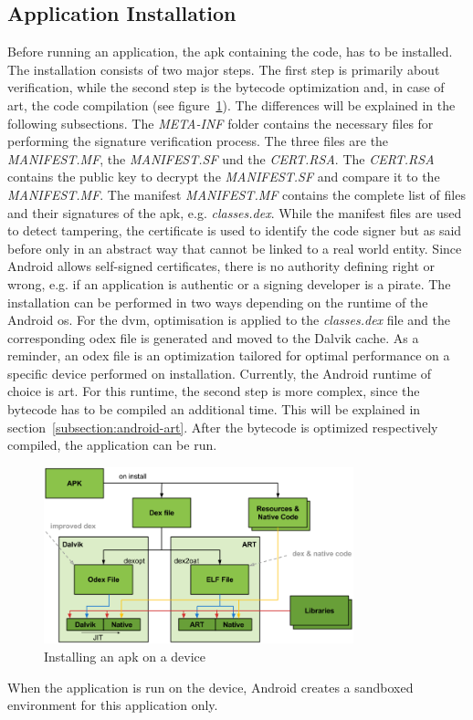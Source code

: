 \subsection{Application Installation} \label{subsection:android-install}
Before running an application, the \gls{apk} containing the code, has to be installed.
The installation consists of two major steps.
The first step is primarily about verification, while the second step is the bytecode optimization and, in case of \gls{art}, the code compilation (see figure~\ref{fig:install}).
The differences will be explained in the following subsections.
\newline
The \textit{META-INF} folder contains the necessary files for performing the signature verification process.
The three files are the \textit{MANIFEST.MF}, the \textit{MANIFEST.SF} und the \textit{CERT.RSA}.
The \textit{CERT.RSA} contains the public key to decrypt the \textit{MANIFEST.SF} and compare it to the \textit{MANIFEST.MF}.
The manifest \textit{MANIFEST.MF} contains the complete list of files and their signatures of the \gls{apk}, e.g. \textit{classes.dex}.
While the manifest files are used to detect tampering, the certificate is used to identify the code signer but as said before only in an abstract way that cannot be linked to a real world entity.
Since Android allows self-signed certificates, there is no authority defining right or wrong, e.g. if an application is authentic or a signing developer is a pirate. \cite{codeSigning} \cite{androidSigning} \cite{nelenkovSelf}
\newline
The installation can be performed in two ways depending on the runtime of the Android \gls{os}.
For the \gls{dvm}, optimisation is applied to the \textit{classes.dex} file and the corresponding \gls{odex} file is generated and moved to the Dalvik cache.
As a reminder, an \gls{odex} file is an optimization tailored for optimal performance on a specific device performed on installation.
\newline
Currently, the Android runtime of choice is \gls{art}.
For this runtime, the second step is more complex, since the bytecode has to be compiled an additional time.
This will be explained in section~\ref{subsection:android-art}.
\newline
After the bytecode is optimized respectively compiled, the application can be run.
\newline
\begin{figure}[h]
    \centering
    \includegraphics[width=0.8\textwidth]{data/install.png}
    \caption{Installing an \gls{apk} on a device \cite{googleIOArt}}
    \label{fig:install}
\end{figure}
\newline
When the application is run on the device, Android creates a sandboxed environment for this application only.
